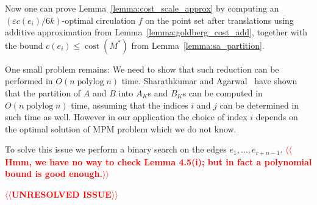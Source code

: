 \documentclass[a4paper,UKenglish]{socg-lipics-v2018}
\makeatletter
\def\note#1{\textcolor{red}{{#1}}}
\def\polylog{\mathop{\mathrm{polylog}}}
\def\eps{\varepsilon}
\def\cost{\operatorname{cost}}
\theoremstyle{plain}
\numberwithin{figure}{section}
\def\n@te#1{\textsf{\boldmath \textbf{$\langle\!\langle$#1$\rangle\!\rangle$}}\leavevmode}
\def\note#1{\textcolor{red}{\n@te{#1}}}
\makeatother
\begin{document}
Now one can prove Lemma~\ref{lemma:cost_scale_approx} by computing an $(\eps c(e_i)/6k)$-optimal
circulation $f$ on the point set after translations using additive approximation from Lemma~\ref{lemma:goldberg_cost_add}, together with the bound $c(e_i) \leq \cost(M^*)$ from
Lemma~\ref{lemma:sa_partition}.


One small problem remains: We need to show that such reduction can be performed in $O(n\polylog n)$ time.
Sharathkumar and Agarwal~\cite{SA12} have shown that the partition of $A$ and $B$ into $A_K$s and $B_K$s can be computed in $O(n \polylog n)$ time, assuming that the indices $i$ and $j$ can be determined in such time as well.  However in our application the choice of index $i$ depends on the optimal solution of MPM problem which we do not know.

To solve this issue we perform a binary search on the edges $e_1, \ldots, e_{r+n-1}$.  \note{Hmm, we have no way to check Lemma 4.5(i); but in fact a polynomial bound is good enough.}

\note{UNRESOLVED ISSUE}


%
\end{document}

